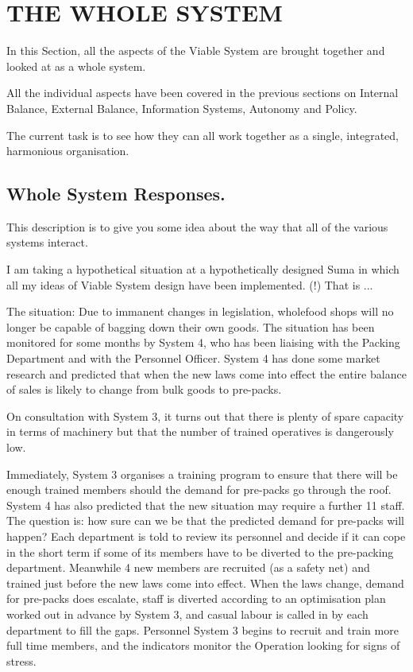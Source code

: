 \chapter{THE WHOLE SYSTEM}
  \label{THE WHOLE SYSTEM}
In this Section, all the aspects of the Viable System are brought together and looked at as a whole system.

All the individual aspects have been covered in the previous sections on Internal Balance, External Balance, Information Systems, Autonomy and Policy.

The current task is to see how they can all work together as a single, integrated, harmonious organisation.

\section*{Whole System Responses.}
This description is to give you some idea about the way that all of the various systems interact.

I am taking a hypothetical situation at a hypothetically designed Suma in which all my ideas of Viable System design have been implemented. (!) That is ...

The situation: Due to immanent changes in legislation, wholefood shops will no longer be capable of bagging down their own goods. The situation has been monitored for some months by System 4, who has been liaising with the Packing Department and with the Personnel Officer. System 4 has done some market research and predicted that when the new laws come into effect the entire balance of sales is likely to change from bulk goods to pre-packs.

On consultation with System 3, it turns out that there is plenty of spare capacity in terms of machinery but that the number of trained operatives is dangerously low.

Immediately, System 3 organises a training program to ensure that there will be enough trained members should the demand for pre-packs go through the roof. System 4 has also predicted that the new situation may require a further 11 staff. The question is: how sure can we be that the predicted demand for pre-packs will happen? Each department is told to review its personnel and decide if it can cope in the short term if some of its members have to be diverted to the pre-packing department. Meanwhile 4 new members are recruited (as a safety net) and trained just before the new laws come into effect. When the laws change, demand for pre-packs does escalate, staff is diverted according to an optimisation plan worked out in advance by System 3, and casual labour is called in by each department to fill the gaps. Personnel System 3 begins to recruit and train more full time members, and the indicators monitor the Operation looking for signs of stress.

